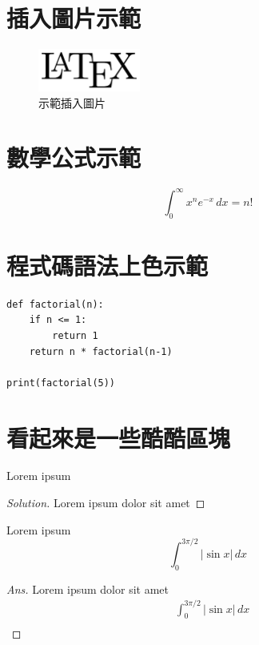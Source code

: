 \documentclass[12pt]{article}
\newenvironment{exercise}[2][Exercise]{\begin{trivlist}
\item[\hskip \labelsep {\bfseries #1}\hskip \labelsep {\bfseries #2.}]}{\end{trivlist}}
\newenvironment{problem}[2][Problem]{\begin{trivlist}
\item[\hskip \labelsep {\bfseries #1}\hskip \labelsep {\bfseries #2}]}{\end{trivlist}}
\newenvironment{solution}{\begin{proof}[Solution]}{\end{proof}}
\newenvironment{answer}{\begin{proof}[Ans]}{\end{proof}}
\begin{document}
\section{插入圖片示範}
\begin{figure}[ht]
  \centering
  \includegraphics[width=0.3\textwidth]{example.png} %
  \caption{示範插入圖片}
  \label{fig:example}
\end{figure}

\section{數學公式示範}
\[
  \int_{0}^{\infty} x^n e^{-x}\, dx = n!
\]

\section{程式碼語法上色示範}
\begin{verbatim}
def factorial(n):
    if n <= 1:
        return 1
    return n * factorial(n-1)

print(factorial(5))
\end{verbatim}

\section{看起來是一些酷酷區塊}

\begin{problem}{1}
  Lorem ipsum
\end{problem}

\begin{solution}
  Lorem ipsum dolor sit amet
\end{solution}

\begin{exercise}{123}
  Lorem ipsum
  \begin{equation*}
    \int_0^{3\pi/2}|\sin x|\,dx
  \end{equation*}
\end{exercise}

\begin{answer}
  Lorem ipsum dolor sit amet
  \begin{equation*}
    \begin{split}
      &  \int_0^{3\pi/2}|\sin x|\,dx \\
    \end{split}
  \end{equation*}
\end{answer}

\end{document}
